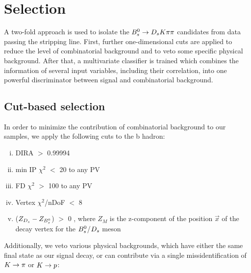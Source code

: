 \section{Selection}
\label{sec:Selection}

A two-fold approach is used to isolate the ${{B}^0_{s}}\rightarrow{\ensuremath{{D}_{s}}}{\ensuremath{K}}{\ensuremath{\pi}}{\ensuremath{\pi}}$ candidates from data passing the stripping line. 
First, further one-dimensional cuts are applied to reduce the level of combinatorial background and to veto some specific physical background. 
After that, a multivariate classifier is trained which combines the information of several input variables, including their correlation, into one powerful discriminator
between signal and combinatorial background. 

\subsection{Cut-based selection}

In order to minimize the contribution of combinatorial background to our samples, we apply the following cuts to the b hadron:

\begin{enumerate}[(i)]

\item DIRA $>$ 0.99994

\item min IP $\chi^{2}$ $<$ 20 to any PV

\item FD $\chi^{2}$ $>$ 100 to any PV

\item Vertex $\chi^{2}$/nDoF $<$ 8 

\item ($Z_{{{D}_{s}}}-Z_{{{B}^0_{s}}}$) $>$ 0 , where $Z_{M}$ is the z-component of the position $\vec{x}$ of the decay vertex for the ${{B}^0_{s}}$/${{D}_{s}}$ meson

\end{enumerate}    


Additionally, we veto various physical backgrounds, which have either the same final state as our signal decay, or can contribute via a single missidentification of ${K}\rightarrow{\ensuremath{\pi}}$ or ${K}\rightarrow{\ensuremath{p}}$:

